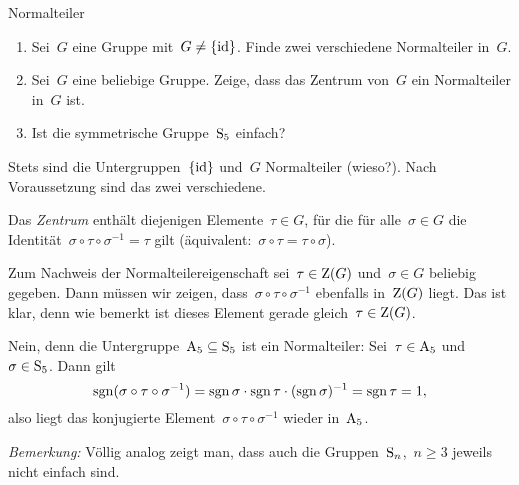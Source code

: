 \documentclass{algblatt}
\begin{document}
\ifloesungen\newpage\fi
\begin{aufgabe}{Normalteiler}
\begin{enumerate}
\item Sei~$G$ eine Gruppe mit~$G \neq \{ \mathrm{id} \}$. Finde
zwei verschiedene Normalteiler in~$G$.
\item Sei~$G$ eine beliebige Gruppe. Zeige, dass das Zentrum von~$G$ ein
Normalteiler in~$G$ ist.
\item Ist die symmetrische Gruppe~$\mathrm{S}_5$ einfach?
\end{enumerate}

\begin{loesungE}
\item Stets sind die Untergruppen~$\{\mathrm{id}\}$ und~$G$ Normalteiler (wieso?). Nach
Voraussetzung sind das zwei verschiedene.

\item Das \emph{Zentrum} enthält diejenigen Elemente~$\tau \in G$, für die für
alle~$\sigma \in G$ die Identität~$\sigma \circ \tau \circ \sigma^{-1} = \tau$
gilt (äquivalent:~$\sigma \circ \tau = \tau \circ \sigma$).

Zum Nachweis der Normalteilereigenschaft sei~$\tau \in \mathrm{Z}(G)$ und~$\sigma \in
G$ beliebig gegeben. Dann müssen wir
zeigen, dass~$\sigma \circ \tau \circ \sigma^{-1}$ ebenfalls in~$\mathrm{Z}(G)$
liegt. Das ist klar, denn wie bemerkt ist dieses Element gerade gleich~$\tau
\in \mathrm{Z}(G)$.

\item Nein, denn die Untergruppe~$\mathrm{A}_5 \subseteq \mathrm{S}_5$ ist ein
Normalteiler: Sei~$\tau \in \mathrm{A}_5$ und~$\sigma \in \mathrm{S}_5$. Dann gilt
\[ \operatorname{sgn}(\sigma \circ \tau \circ \sigma^{-1}) =
  \operatorname{sgn}\sigma \cdot \operatorname{sgn}\tau \cdot (\operatorname{sgn}\sigma)^{-1} =
  \operatorname{sgn}\tau = 1, \]
also liegt das konjugierte Element~$\sigma \circ \tau \circ \sigma^{-1}$ wieder
in~$\mathrm{A}_5$.

\emph{Bemerkung:} Völlig analog zeigt man, dass auch die Gruppen~$\mathrm{S}_n$,~$n
\geq 3$ jeweils nicht einfach sind.
\end{loesungE}
\end{aufgabe}
\end{document}
